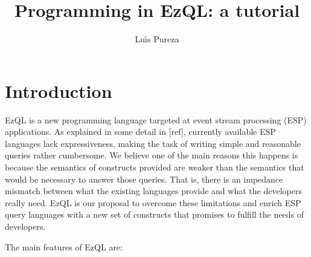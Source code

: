 \documentclass{report}
\begin{document}
\title{Programming in EzQL: a tutorial}
\author{Lu\'{\i}s Pureza}

\maketitle

\tableofcontents

\addtolength{\parskip}{\baselineskip}
\chapter{Introduction}
\label{chap:introduction}
EzQL is a new programming language targeted at event stream processing
(ESP) applications. As explained in some detail in [ref], currently
available ESP languages lack expressiveness, making the task of writing
simple and reasonable queries rather cumbersome. We believe one of the
main reasons this happens is because the semantics of constructs
provided are weaker than the semantics that would be necessary to
answer those queries. That is, there is an impedance mismatch between
what the existing languages provide and what the developers really
need. EzQL is our proposal to overcome these limitations and enrich
ESP query languages with a new set of constructs that promises to
fulfill the needs of developers.

The main features of EzQL are:
\end{document}
